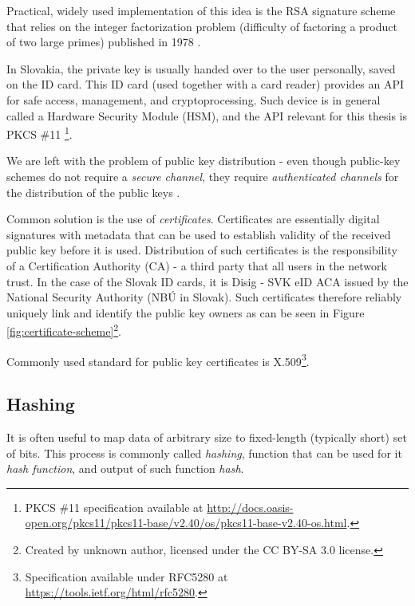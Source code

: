 \documentclass[thesismargins, english, thesislinespacing, twoside, openright, upjsfrontpage]{rnthesis}
\begin{document}
Practical, widely used implementation of this idea is the RSA signature scheme that relies on the integer factorization problem (difficulty of factoring a product of two large primes) published in 1978 \cite{rsa}.

In Slovakia, the private key is usually handed over to the user personally, saved on the ID card. This ID card (used together with a card reader) provides an API for safe access, management, and cryptoprocessing. Such device is in general called a Hardware Security Module (HSM), and the API relevant for this thesis is PKCS \#11 \footnote{PKCS \#11 specification available at \url{http://docs.oasis-open.org/pkcs11/pkcs11-base/v2.40/os/pkcs11-base-v2.40-os.html}.}.

We are left with the problem of public key distribution - even though public-key schemes do not require a \textit{secure channel}, they require \textit{authenticated channels} for the distribution of the public keys \cite{cryptotxtbook}.

Common solution is the use of \textit{certificates}. Certificates are essentially digital signatures with metadata that can be used to establish validity of the received public key before it is used.
Distribution of such certificates is the responsibility of a Certification Authority (CA) - a third party that all users in the network trust. In the case of the Slovak ID cards, it is Disig - SVK eID ACA issued by the National Security Authority (NBÚ in Slovak).
Such certificates therefore reliably uniquely link and identify the public key owners as can be seen in Figure \ref{fig:certificate-scheme}\footnote{Created by unknown author, licensed under the CC BY-SA 3.0 license.}.


Commonly used standard for public key certificates is X.509\footnote{Specification available under RFC5280 at \url{https://tools.ietf.org/html/rfc5280}.}.

\subsection{Hashing}

It is often useful to map data of arbitrary size to fixed-length (typically short) set of bits. This process is commonly called \textit{hashing}, function that can be used for it \textit{hash function}, and output of such function \textit{hash}.
\end{document}
